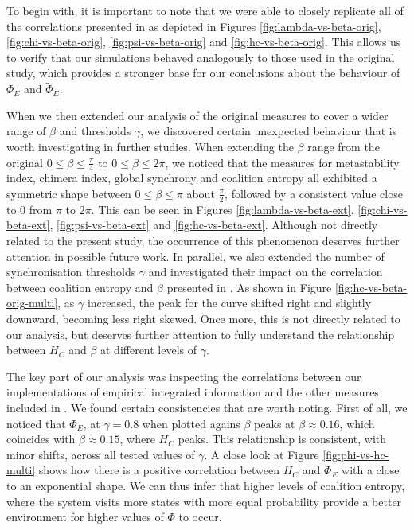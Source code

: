 \documentclass[a4paper,11pt]{article}
\begin{document}
To begin with, it is important to note that we were able to closely replicate all of the correlations presented in \cite{Shanahan2010} as depicted in Figures \ref{fig:lambda-vs-beta-orig}, \ref{fig:chi-vs-beta-orig}, \ref{fig:psi-vs-beta-orig} and \ref{fig:hc-vs-beta-orig}. This allows us to verify that our simulations behaved analogously to those used in the original study, which provides a stronger base for our conclusions about the behaviour of $\Phi_E$ and $\widetilde{\Phi}_E$. 

When we then extended our analysis of the original measures to cover a wider range of $\beta$ and thresholds $\gamma$, we discovered certain unexpected behaviour that is worth investigating in further studies. When extending the $\beta$ range from the original $0 \leq \beta \leq \frac{\pi}{4}$ to $0 \leq \beta \leq 2\pi$, we noticed that the measures for metastability index, chimera index, global synchrony and coalition entropy all exhibited a symmetric shape between $0 \leq \beta \leq \pi$ about $\frac{\pi}{2}$, followed by a consistent value close to $0$ from $\pi$ to $2\pi$. This can be seen in Figures \ref{fig:lambda-vs-beta-ext}, \ref{fig:chi-vs-beta-ext}, \ref{fig:psi-vs-beta-ext} and \ref{fig:hc-vs-beta-ext}. Although not directly related to the present study, the occurrence of this phenomenon deserves further attention in possible future work. In parallel, we also extended the number of synchronisation thresholds  $\gamma$ and investigated their impact on the correlation between coalition entropy and $\beta$ presented in \cite{Shanahan2010}. As shown in Figure \ref{fig:hc-vs-beta-orig-multi}, as $\gamma$ increased, the peak for the curve shifted right and slightly downward, becoming less right skewed. Once more, this is not directly related to our analysis, but deserves further attention to fully understand the relationship between $H_C$ and $\beta$ at different levels of $\gamma$.

The key part of our analysis was inspecting the correlations between our implementations of empirical integrated information and the other measures included in \cite{Shanahan2010}. We found certain consistencies that are worth noting. First of all, we noticed that $\Phi_E$, at $\gamma = 0.8$ when plotted agains $\beta$ peaks at $\beta \approx 0.16$, which coincides with $\beta \approx 0.15$, where $H_C$ peaks. This relationship is consistent, with minor shifts, across all tested values of $\gamma$. A close look at Figure \ref{fig:phi-vs-hc-multi} shows how there is a positive correlation between $H_C$ and $\Phi_E$ with a close to an exponential shape. We can thus infer that higher levels of coalition entropy, where the system visits more states with more equal probability provide a better environment for higher values of $\Phi$ to occur.
\end{document}
